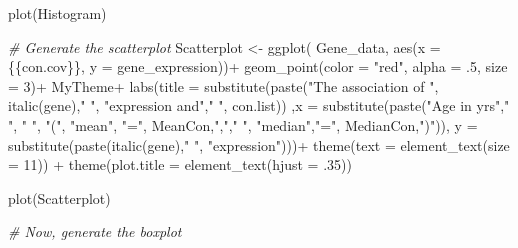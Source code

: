 \documentclass[
]{article}
\newenvironment{Shaded}{\begin{snugshade}}{\end{snugshade}}
\newcommand{\AttributeTok}[1]{\textcolor[rgb]{0.77,0.63,0.00}{#1}}
\newcommand{\CommentTok}[1]{\textcolor[rgb]{0.56,0.35,0.01}{\textit{#1}}}
\newcommand{\DecValTok}[1]{\textcolor[rgb]{0.00,0.00,0.81}{#1}}
\newcommand{\FunctionTok}[1]{\textcolor[rgb]{0.00,0.00,0.00}{#1}}
\newcommand{\NormalTok}[1]{#1}
\newcommand{\OtherTok}[1]{\textcolor[rgb]{0.56,0.35,0.01}{#1}}
\newcommand{\SpecialCharTok}[1]{\textcolor[rgb]{0.00,0.00,0.00}{#1}}
\newcommand{\StringTok}[1]{\textcolor[rgb]{0.31,0.60,0.02}{#1}}
\begin{document}
\begin{Shaded}
\begin{Highlighting}[]
\FunctionTok{plot}\NormalTok{(Histogram)}

\CommentTok{\# Generate the scatterplot}
\NormalTok{Scatterplot }\OtherTok{\textless{}{-}} \FunctionTok{ggplot}\NormalTok{( Gene\_data, }\FunctionTok{aes}\NormalTok{(}\AttributeTok{x =}\NormalTok{ \{\{con.cov\}\}, }\AttributeTok{y =}\NormalTok{ gene\_expression))}\SpecialCharTok{+}
  \FunctionTok{geom\_point}\NormalTok{(}\AttributeTok{color =} \StringTok{"red"}\NormalTok{, }\AttributeTok{alpha =}\NormalTok{ .}\DecValTok{5}\NormalTok{, }\AttributeTok{size =} \DecValTok{3}\NormalTok{)}\SpecialCharTok{+}
\NormalTok{  MyTheme}\SpecialCharTok{+}
  \FunctionTok{labs}\NormalTok{(}\AttributeTok{title =} \FunctionTok{substitute}\NormalTok{(}\FunctionTok{paste}\NormalTok{(}\StringTok{"The association of "}\NormalTok{, }\FunctionTok{italic}\NormalTok{(gene),}\StringTok{" "}\NormalTok{, }\StringTok{"expression and"}\NormalTok{,}\StringTok{" "}\NormalTok{, con.list)) ,}\AttributeTok{x =} \FunctionTok{substitute}\NormalTok{(}\FunctionTok{paste}\NormalTok{(}\StringTok{"Age in yrs"}\NormalTok{,}\StringTok{" "}\NormalTok{, }\StringTok{" "}\NormalTok{, }\StringTok{"("}\NormalTok{, }\StringTok{"mean"}\NormalTok{, }\StringTok{"="}\NormalTok{, MeanCon,}\StringTok{","}\NormalTok{,}\StringTok{" "}\NormalTok{, }\StringTok{"median"}\NormalTok{,}\StringTok{"="}\NormalTok{, MedianCon,}\StringTok{")"}\NormalTok{)), }\AttributeTok{y =} \FunctionTok{substitute}\NormalTok{(}\FunctionTok{paste}\NormalTok{(}\FunctionTok{italic}\NormalTok{(gene),}\StringTok{" "}\NormalTok{, }\StringTok{"expression"}\NormalTok{)))}\SpecialCharTok{+}
  \FunctionTok{theme}\NormalTok{(}\AttributeTok{text =} \FunctionTok{element\_text}\NormalTok{(}\AttributeTok{size =} \DecValTok{11}\NormalTok{)) }\SpecialCharTok{+} 
  \FunctionTok{theme}\NormalTok{(}\AttributeTok{plot.title =} \FunctionTok{element\_text}\NormalTok{(}\AttributeTok{hjust =}\NormalTok{ .}\DecValTok{35}\NormalTok{))}

\FunctionTok{plot}\NormalTok{(Scatterplot)}

\CommentTok{\# Now, generate the boxplot}


\end{Highlighting}
\end{Shaded}
\end{document}

